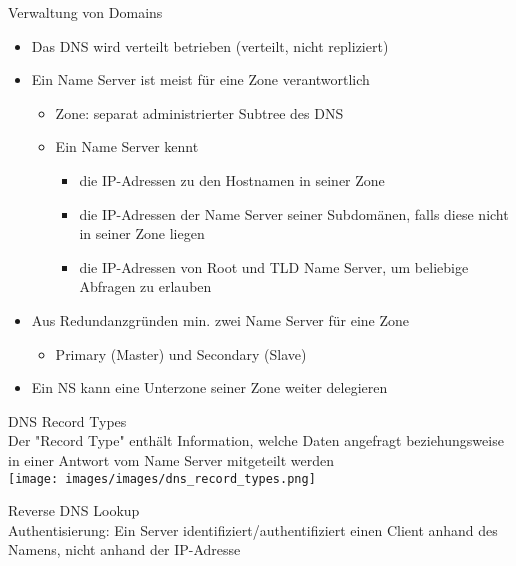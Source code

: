 \begin{concept}{Verwaltung von Domains}
    \begin{itemize}
        \item Das DNS wird verteilt betrieben (verteilt, nicht repliziert)
        \item Ein Name Server ist meist für eine Zone verantwortlich
        \begin{itemize}
            \item Zone: separat administrierter Subtree des DNS
            \item Ein Name Server kennt
            \begin{itemize}
                \item die IP-Adressen zu den Hostnamen in seiner Zone
                \item die IP-Adressen der Name Server seiner Subdomänen, falls diese nicht in seiner Zone liegen
                \item die IP-Adressen von Root und TLD Name Server, um beliebige Abfragen zu erlauben
            \end{itemize}
        \end{itemize}
        \item Aus Redundanzgründen min. zwei Name Server für eine Zone
        \begin{itemize}
            \item Primary (Master) und Secondary (Slave) 
        \end{itemize}
        \item Ein NS kann eine Unterzone seiner Zone weiter delegieren
    \end{itemize}
\end{concept}

\begin{definition}{DNS Record Types}\\
    Der "Record Type" enthält Information, welche Daten angefragt beziehungsweise in einer
    Antwort vom Name Server mitgeteilt werden\\
    \texttt{[image: images/images/dns\_record\_types.png]}
\end{definition}

\begin{definition}{Reverse DNS Lookup}\\
    Authentisierung: Ein Server identifiziert/authentifiziert einen Client anhand des Namens, nicht anhand der IP-Adresse
\end{definition}

